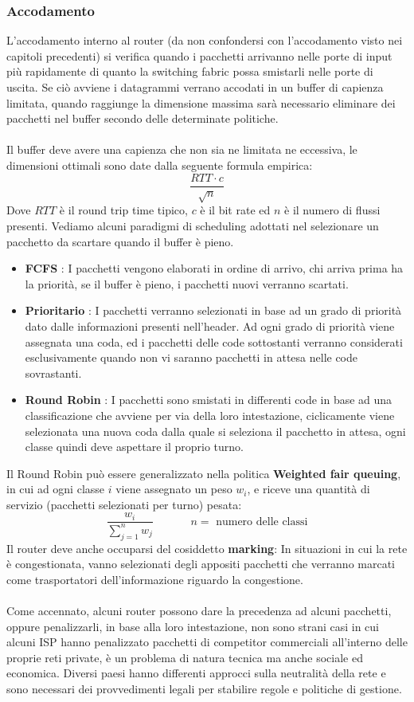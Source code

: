 \documentclass[12pt, letterpaper]{article}
\newcommand{\acc}{\\\hphantom{}\\}
\begin{document}
\subsubsection{Accodamento}
L'accodamento interno al router (da non confondersi con l'accodamento visto nei capitoli precedenti) si verifica quando 
i pacchetti arrivanno nelle porte di input più rapidamente di quanto la switching fabric possa smistarli nelle 
porte di uscita. Se ciò avviene i datagrammi verrano accodati in un buffer di capienza limitata, quando raggiunge la dimensione 
massima sarà necessario eliminare dei pacchetti nel buffer secondo delle determinate politiche.\acc 
Il buffer deve avere una capienza che non sia ne limitata ne eccessiva, le dimensioni ottimali sono date dalla 
seguente formula empirica: $$\dfrac{ RTT\cdot c}{\sqrt{n}}$$
Dove $RTT$ è il round trip time tipico, $c$ è il bit rate ed $n$ è il numero di flussi presenti. Vediamo alcuni paradigmi di 
scheduling adottati nel selezionare un pacchetto da scartare quando il buffer è pieno.\begin{itemize}
    \item \textbf{FCFS} : I pacchetti vengono elaborati in ordine di arrivo, chi arriva prima ha la priorità, se il buffer 
    è pieno, i pacchetti nuovi verranno scartati. 
    \item \textbf{Prioritario} : I pacchetti verranno selezionati in base ad un grado di priorità dato dalle informazioni 
    presenti nell'header. Ad ogni grado di priorità viene assegnata una coda, ed i pacchetti delle code sottostanti verranno 
    considerati esclusivamente quando non vi saranno pacchetti in attesa nelle code sovrastanti.
    \item \textbf{Round Robin} : I pacchetti sono smistati in differenti code in base ad una classificazione che avviene 
    per via della loro intestazione, ciclicamente viene selezionata una nuova coda dalla quale si seleziona il pacchetto in 
    attesa, ogni classe quindi deve aspettare il proprio turno.
\end{itemize} 
Il Round Robin può essere generalizzato nella politica \textbf{Weighted fair queuing}, in cui ad ogni classe $i$ viene 
assegnato un peso $w_i$, e riceve una quantità di servizio (pacchetti selezionati per turno) pesata: 
$$ \dfrac{w_i}{\sum_{j=1}^nw_j}\;\;\;\;\;\;\;\;\;\;\;\;n=\text{ numero delle classi}$$
Il router deve anche occuparsi del cosiddetto \textbf{marking}: In situazioni in cui la rete è congestionata, vanno 
selezionati degli appositi pacchetti che verranno marcati come trasportatori dell'informazione riguardo la congestione.\acc 
Come accennato, alcuni router possono dare la precedenza ad alcuni pacchetti, oppure penalizzarli, in base alla loro intestazione, 
non sono strani casi in cui alcuni ISP hanno penalizzato pacchetti di competitor commerciali all'interno delle proprie reti 
private, è un problema di natura tecnica ma anche sociale ed economica. Diversi paesi hanno differenti approcci sulla neutralità 
della rete e sono necessari dei provvedimenti legali per stabilire regole e politiche di gestione.
\end{document}
